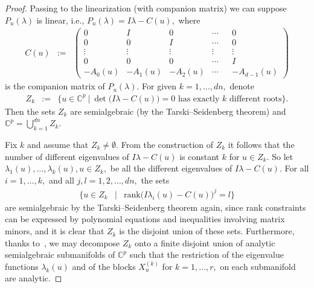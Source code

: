 \documentclass[10pt,reqno]{amsart}
\theoremstyle{break-italic}
\theoremstyle{break-italic}
\theoremstyle{break-italic}
\theoremstyle{break-italic}
\theoremstyle{break-italic}
\theoremstyle{break-italic}
\theoremstyle{break-italic}
\theoremstyle{break-italic}
\theoremstyle{break-roman}
\theoremstyle{standard}
\theoremstyle{varthm-roman}
\theoremstyle{varthm-italic}
\theoremstyle{varthm-roman-break}
\theoremstyle{varthm-italic-break}
\theoremstyle{varthm-roman-no-punctuation}
\theoremstyle{varthm-italic-no-punctuation}
\numberwithin{equation}{section}
\begin{document}
\begin{proof}
Passing to the linearization (with companion matrix) we can suppose $P_u(\lambda)$ is linear, i.e., $P_u(\lambda) = I \lambda - C(u),$ where
\begin{eqnarray*}
C(u) &:=&
\begin{pmatrix}
0 & I & 0 & \cdots & & 0 \\
0 & 0 & I & \cdots & & 0 \\
\vdots & \vdots & \vdots & \vdots & & \vdots \\
0 & 0 & 0 & \cdots & & I \\
- A_0(u) & - A_1(u) &  - A_2(u) & \cdots &  & -A_{d - 1}(u)
\end{pmatrix}
\end{eqnarray*}
is the companion matrix of $P_u(\lambda).$ For given $k = 1, \ldots, dn,$ denote
\begin{eqnarray*}
Z_k &:=& \{u \in \mathbb{C}^p \ | \ \det \big (I \lambda - C(u) \big)  = 0 \textrm{ has exactly $k$ different roots} \}.
\end{eqnarray*}
Then the sets $Z_k$ are semialgebraic (by the Tarski--Seidenberg theorem) and $\mathbb{C}^p = \displaystyle\bigcup_{k = 1}^{dn} Z_k.$


Fix $k$ and assume that $Z_k \ne \emptyset.$ From the construction of $Z_k$ it follows that the number of different
eigenvalues of $I \lambda - C(u)$ is constant $k$ for $u \in Z_k.$ So let $\lambda_1(u), \ldots, \lambda_k(u), u \in Z_k,$ be all the different eigenvalues of $I \lambda - C(u).$
For all $i = 1, \ldots, k,$ and all $j, l  = 1, 2, \ldots, dn,$ the sets
\begin{eqnarray*}
\{u \in Z_k & | & \mathrm{rank} \big (I \lambda_i(u) - C(u) \big )^j = l \}
\end{eqnarray*}
are semialgebraic  by the Tarski--Seidenberg theorem again, since rank constraints can be expressed by polynomial equations and inequalities involving matrix minors, and it is clear that $Z_k$ is the disjoint union of these sets. Furthermore, thanks to~\cite[Theorem~1.7]{HP2017}, we may decompose $Z_k$ onto a finite disjoint union of analytic semialgebraic submanifolds of $\mathbb{C}^p$ such that the restriction of the eigenvalue functions
$\lambda_{k}(u)$ and of the blocks $X_u^{(k)}$ for $k = 1, \ldots, r,$ on each submanifold are analytic.


\end{proof}
\end{document}
